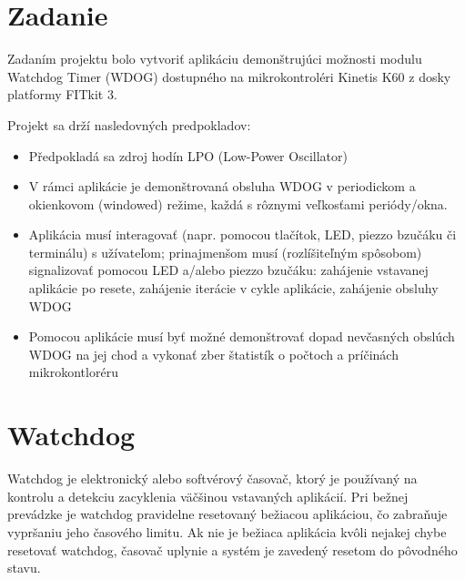 \documentclass[12pt,a4paper,titlepage,final]{article}
\begin{document}


\pagestyle{plain}
\setcounter{page}{1}
\tableofcontents

\newpage
\pagestyle{plain}
\setcounter{page}{1}



\section{Zadanie}
Zadaním projektu bolo vytvoriť aplikáciu demonštrujúci možnosti modulu Watchdog Timer (WDOG) dostupného na mikrokontroléri Kinetis K60 z dosky platformy FITkit 3.

Projekt sa drží nasledovných predpokladov:
\begin{itemize}
    \item Předpokladá sa zdroj hodín LPO (Low-Power Oscillator)
    \item V rámci aplikácie je demonštrovaná obsluha WDOG v periodickom a okienkovom (windowed) režime, každá s rôznymi veľkosťami periódy/okna.
    \item Aplikácia musí interagovať (napr. pomocou tlačítok, LED, piezzo bzučáku či terminálu) s užívateľom; prinajmenšom musí (rozlíšiteľným spôsobom) signalizovať pomocou LED a/alebo piezzo bzučáku: zahájenie vstavanej aplikácie po resete, zahájenie iterácie v cykle aplikácie, zahájenie obsluhy WDOG
    \item Pomocou aplikácie musí byť možné demonštrovať dopad nevčasných obslúch WDOG na jej chod a vykonať zber štatistík o počtoch a príčinách mikrokontloréru
\end{itemize}

\section{Watchdog}
Watchdog je elektronický alebo softvérový časovač, ktorý je používaný na kontrolu a detekciu zacyklenia väčšinou vstavaných aplikácií. Pri bežnej prevádzke je watchdog pravidelne resetovaný bežiacou aplikáciou, čo zabraňuje vypršaniu jeho časového limitu. Ak nie je  bežiaca aplikácia kvôli nejakej chybe resetovať watchdog, časovač uplynie a systém je zavedený resetom do pôvodného stavu.
\end{document}
